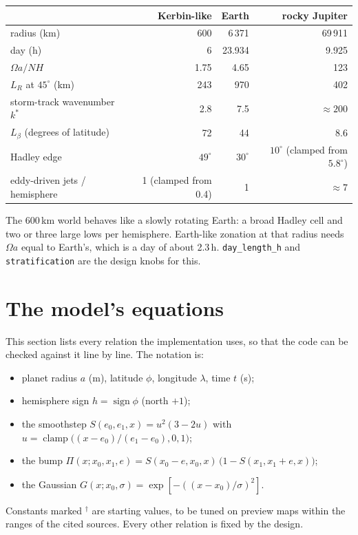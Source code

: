 \documentclass[11pt,a4paper]{article}
\begin{document}
\begin{center}
\begin{tabular}{lrrr}
\toprule
 & Kerbin-like & Earth & rocky Jupiter \\
\midrule
radius (km) & 600 & 6\,371 & 69\,911 \\
day (h) & 6 & 23.934 & 9.925 \\
$\Omega a / NH$ & 1.75 & 4.65 & 123 \\
$L_R$ at $45^\circ$ (km) & 243 & 970 & 402 \\
storm-track wavenumber $k^*$ & 2.8 & 7.5 & $\approx 200$ \\
$L_\beta$ (degrees of latitude) & 72 & 44 & 8.6 \\
Hadley edge & $49^\circ$ & $30^\circ$ & $10^\circ$ (clamped from $5.8^\circ$) \\
eddy-driven jets / hemisphere & 1 (clamped from 0.4) & 1 & $\approx 7$ \\
\bottomrule
\end{tabular}
\end{center}

The 600\,km world behaves like a slowly rotating Earth: a broad Hadley cell and two or three
large lows per hemisphere. Earth-like zonation at that radius needs $\Omega a$ equal to
Earth's, which is a day of about 2.3\,h. \texttt{day\_length\_h} and
\texttt{stratification} are the design knobs for this.

\section{The model's equations}
\label{sec:equations}
This section lists every relation the implementation uses, so that the code can be checked
against it line by line. The notation is:
\begin{itemize}
\item planet radius $a$ (m), latitude $\phi$, longitude $\lambda$, time $t$ (s);
\item hemisphere sign $h=\operatorname{sign}\phi$ (north $+1$);
\item the smoothstep $S(e_0,e_1,x)=u^2(3-2u)$ with $u=\operatorname{clamp}\!\big((x-e_0)/(e_1-e_0),0,1\big)$;
\item the bump $\Pi(x;x_0,x_1,e)=S(x_0-e,x_0,x)\,\big(1-S(x_1,x_1+e,x)\big)$;
\item the Gaussian $G(x;x_0,\sigma)=\exp[-((x-x_0)/\sigma)^2]$.
\end{itemize}
Constants marked $^\dagger$ are starting values, to be tuned on preview maps within the
ranges of the cited sources. Every other relation is fixed by the design.
\end{document}
